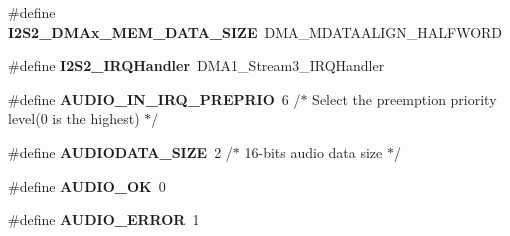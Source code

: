 \begin{DoxyCompactItemize}
\item 
\mbox{\label{group___s_t_m32_f4___d_i_s_c_o_v_e_r_y___a_u_d_i_o___o_u_t___exported___constants_gae038aeb03505aba187c8a98ef088af07}} 
\#define {\bfseries I2\+S2\+\_\+\+D\+M\+Ax\+\_\+\+M\+E\+M\+\_\+\+D\+A\+T\+A\+\_\+\+S\+I\+ZE}~D\+M\+A\+\_\+\+M\+D\+A\+T\+A\+A\+L\+I\+G\+N\+\_\+\+H\+A\+L\+F\+W\+O\+RD
\item 
\mbox{\label{group___s_t_m32_f4___d_i_s_c_o_v_e_r_y___a_u_d_i_o___o_u_t___exported___constants_ga5c8b724c5ae871867eb1f480b990725b}} 
\#define {\bfseries I2\+S2\+\_\+\+I\+R\+Q\+Handler}~D\+M\+A1\+\_\+\+Stream3\+\_\+\+I\+R\+Q\+Handler
\item 
\mbox{\label{group___s_t_m32_f4___d_i_s_c_o_v_e_r_y___a_u_d_i_o___o_u_t___exported___constants_ga72dd3b1341b195b23a065887af2d5e64}} 
\#define {\bfseries A\+U\+D\+I\+O\+\_\+\+I\+N\+\_\+\+I\+R\+Q\+\_\+\+P\+R\+E\+P\+R\+IO}~6   /$\ast$ Select the preemption priority level(0 is the highest) $\ast$/
\item 
\mbox{\label{group___s_t_m32_f4___d_i_s_c_o_v_e_r_y___a_u_d_i_o___o_u_t___exported___constants_gae2bdf06edb767a993b69de308b7d7ead}} 
\#define {\bfseries A\+U\+D\+I\+O\+D\+A\+T\+A\+\_\+\+S\+I\+ZE}~2   /$\ast$ 16-\/bits audio data size $\ast$/
\item 
\mbox{\label{group___s_t_m32_f4___d_i_s_c_o_v_e_r_y___a_u_d_i_o___o_u_t___exported___constants_ga21af5d8d6b26a8c6ed1e80fe04560930}} 
\#define {\bfseries A\+U\+D\+I\+O\+\_\+\+OK}~0
\item 
\mbox{\label{group___s_t_m32_f4___d_i_s_c_o_v_e_r_y___a_u_d_i_o___o_u_t___exported___constants_gab3841affe0846cab574935f9f7f54f6e}} 
\#define {\bfseries A\+U\+D\+I\+O\+\_\+\+E\+R\+R\+OR}~1
\item 
\mbox{\label{group___s_t_m32_f4___d_i_s_c_o_v_e_r_y___a_u_d_i_o___o_u_t___exported___constants_ga091d919d7fbae5ad4a57bdcc700b5e1f}} 

\end{DoxyCompactItemize}
